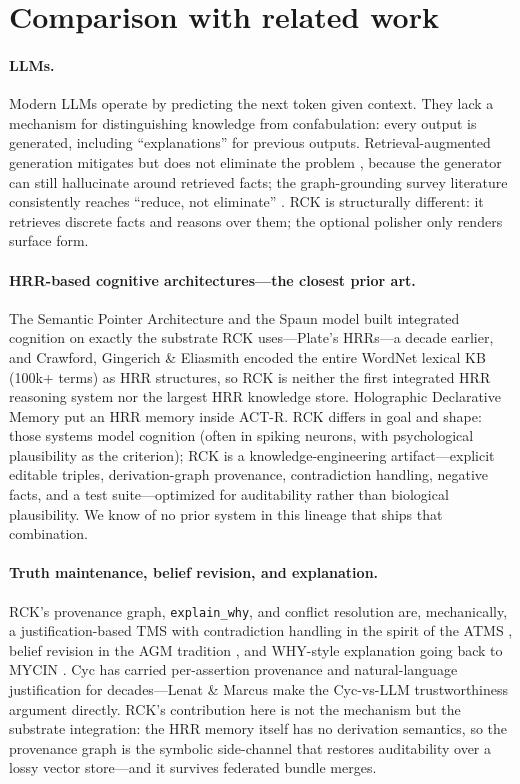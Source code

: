 \documentclass[11pt]{article}
\begin{document}
\section{Comparison with related work}
\label{sec:related}

\paragraph{LLMs.} Modern LLMs operate by predicting the next token
given context. They lack a mechanism for distinguishing knowledge
from confabulation: every output is generated, including
``explanations'' for previous outputs. Retrieval-augmented
generation mitigates but does not eliminate the problem
\cite{rag2020}, because the generator can still hallucinate around
retrieved facts; the graph-grounding survey literature consistently
reaches ``reduce, not eliminate'' \cite{agrawal2024}. RCK is
structurally different: it retrieves discrete facts and reasons
over them; the optional polisher only renders surface form.

\paragraph{HRR-based cognitive architectures---the closest prior
art.} The Semantic Pointer Architecture and the Spaun model
\cite{eliasmith2012spaun, eliasmith2013} built integrated cognition
on exactly the substrate RCK uses---Plate's HRRs---a decade earlier,
and Crawford, Gingerich \& Eliasmith \cite{crawford2016} encoded the
entire WordNet lexical KB (100k+ terms) as HRR structures, so RCK is
neither the first integrated HRR reasoning system nor the largest
HRR knowledge store. Holographic Declarative Memory
\cite{kelly2020hdm} put an HRR memory inside ACT-R. RCK differs in
goal and shape: those systems model cognition (often in spiking
neurons, with psychological plausibility as the criterion); RCK is a
knowledge-engineering artifact---explicit editable triples,
derivation-graph provenance, contradiction handling, negative facts,
and a test suite---optimized for auditability rather than biological
plausibility. We know of no prior system in this lineage that ships
that combination.

\paragraph{Truth maintenance, belief revision, and explanation.}
RCK's provenance graph, \texttt{explain\_why}, and conflict
resolution are, mechanically, a justification-based TMS
\cite{doyle1979tms} with contradiction handling in the spirit of the
ATMS \cite{dekleer1986atms}, belief revision in the AGM tradition
\cite{agm1985}, and WHY-style explanation going back to MYCIN
\cite{buchanan1984mycin}. Cyc has carried per-assertion provenance
and natural-language justification for decades---Lenat \& Marcus
\cite{lenat2023} make the Cyc-vs-LLM trustworthiness argument
directly. RCK's contribution here is not the mechanism but the
substrate integration: the HRR memory itself has no derivation
semantics, so the provenance graph is the symbolic side-channel that
restores auditability over a lossy vector store---and it survives
federated bundle merges.
\end{document}
